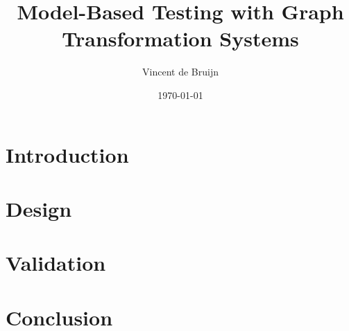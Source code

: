 \documentclass[a4paper]{report}
\begin{document}
	\title{\textbf{Model-Based Testing with Graph Transformation Systems}}
	\author{Vincent de Bruijn}
	\date{\today}
	\maketitle
	
	
	
	\newpage
	\tableofcontents
  \newpage
  
  \newpage
	\chapter{Introduction}
	\newpage
	
	\newpage
	\chapter{Design}
	\newpage
	
	
	
	
	
	
	
	\newpage
	\chapter{Validation}
	\newpage
	
	
	
	
	\newpage
	\chapter{Conclusion}
	\newpage
	
	
	
	

  \newpage
	{}
	
	
	\appendix
  \newpage
\end{document}

